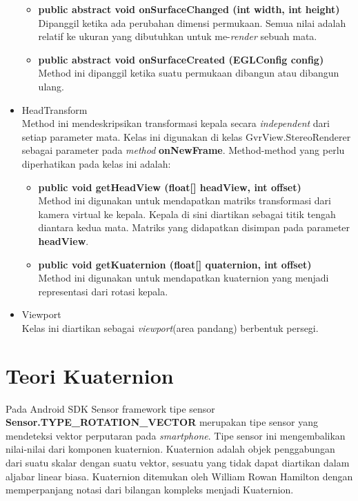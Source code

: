 \begin{itemize}
\begin{itemize}
	\item \textbf{public abstract void onSurfaceChanged (int width, int height)}\\
	Dipanggil ketika ada perubahan dimensi permukaan. Semua nilai adalah relatif ke ukuran yang dibutuhkan untuk me-\textit{render} sebuah mata.
	\item \textbf{public abstract void onSurfaceCreated (EGLConfig config)}\\
	Method ini dipanggil ketika suatu permukaan dibangun atau dibangun ulang.
\end{itemize}
\item HeadTransform\\
	Method ini mendeskripsikan transformasi kepala secara \textit{independent} dari setiap parameter mata. Kelas ini digunakan di kelas GvrView.StereoRenderer sebagai parameter pada \textit{method} \textbf{onNewFrame}. Method-method yang perlu diperhatikan pada kelas ini adalah:
	\begin{itemize}
		\item \textbf{public void getHeadView (float[] headView, int offset)}\\
		Method ini digunakan untuk mendapatkan matriks transformasi dari kamera virtual ke kepala. Kepala di sini diartikan sebagai titik tengah diantara kedua mata. Matriks yang didapatkan disimpan pada parameter \textbf{headView}.
		\item \textbf{public void getKuaternion (float[] quaternion, int offset)}\\
		Method ini digunakan untuk mendapatkan kuaternion yang menjadi representasi dari rotasi kepala.
	\end{itemize}
	\item Viewport\\
	Kelas ini diartikan sebagai \textit{viewport}(area pandang) berbentuk persegi.
\end{itemize}
\section{Teori Kuaternion}
\label{sec:teori_quaternion}

Pada Android SDK Sensor framework tipe sensor \textbf{Sensor.TYPE\_ROTATION\_VECTOR} merupakan tipe sensor yang mendeteksi vektor perputaran pada \textit{smartphone}\cite{kuipers:1999}. Tipe sensor ini mengembalikan nilai-nilai dari komponen kuaternion. 
Kuaternion adalah objek penggabungan dari suatu skalar dengan suatu vektor, sesuatu yang tidak dapat diartikan dalam aljabar linear biasa. Kuaternion ditemukan oleh William Rowan Hamilton dengan memperpanjang notasi dari bilangan kompleks menjadi Kuaternion. 
